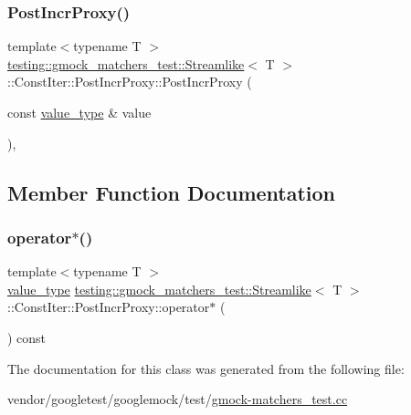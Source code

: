 \subsubsection{\texorpdfstring{Post\+Incr\+Proxy()}{PostIncrProxy()}}
{\footnotesize\ttfamily template$<$typename T $>$ \\
\hyperlink{classtesting_1_1gmock__matchers__test_1_1_streamlike}{testing\+::gmock\+\_\+matchers\+\_\+test\+::\+Streamlike}$<$ T $>$\+::Const\+Iter\+::\+Post\+Incr\+Proxy\+::\+Post\+Incr\+Proxy (\begin{DoxyParamCaption}\item[{const \hyperlink{classtesting_1_1gmock__matchers__test_1_1_streamlike_a7e2c2e021676c1ed5dea63cdd019661c}{value\+\_\+type} \&}]{value }\end{DoxyParamCaption})\hspace{0.3cm}{\ttfamily [inline]}, {\ttfamily [explicit]}}



\subsection{Member Function Documentation}
\mbox{\label{classtesting_1_1gmock__matchers__test_1_1_streamlike_1_1_const_iter_1_1_post_incr_proxy_a7d5416380b6b6cec0d0ed5b5c9be17b3}} 
\subsubsection{\texorpdfstring{operator$\ast$()}{operator*()}}
{\footnotesize\ttfamily template$<$typename T $>$ \\
\hyperlink{classtesting_1_1gmock__matchers__test_1_1_streamlike_a7e2c2e021676c1ed5dea63cdd019661c}{value\+\_\+type} \hyperlink{classtesting_1_1gmock__matchers__test_1_1_streamlike}{testing\+::gmock\+\_\+matchers\+\_\+test\+::\+Streamlike}$<$ T $>$\+::Const\+Iter\+::\+Post\+Incr\+Proxy\+::operator$\ast$ (\begin{DoxyParamCaption}{ }\end{DoxyParamCaption}) const\hspace{0.3cm}{\ttfamily [inline]}}



The documentation for this class was generated from the following file\+:\begin{DoxyCompactItemize}
\item 
vendor/googletest/googlemock/test/\hyperlink{gmock-matchers__test_8cc}{gmock-\/matchers\+\_\+test.\+cc}\end{DoxyCompactItemize}
